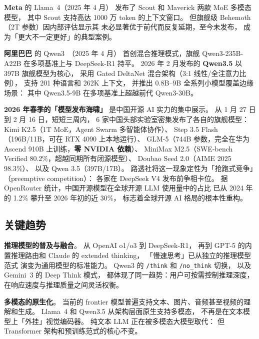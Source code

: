 \textbf{Meta} 的 Llama~4（2025 年 4 月）
发布了 Scout 和 Maverick 两款 MoE 多模态模型，
其中 Scout 支持高达 1000 万 token 的上下文窗口。
但旗舰级 Behemoth（2T 参数）因内部评估显示其
未必显著优于前代而反复延期，至今未发布，
成为「更大不一定更好」的典型案例。

\textbf{阿里巴巴} 的 Qwen3~\cite{qwen2025qwen3}（2025 年 4 月）
首创混合推理模式，旗舰 Qwen3-235B-A22B 在多项基准上与 DeepSeek-R1 持平。
2026 年 2 月发布的 \textbf{Qwen3.5} 以 397B 旗舰模型为核心，
采用 Gated DeltaNet 混合架构（3:1 线性/全注意力比例），
支持 201 种语言和 262K 上下文，
并推出 0.8B--9B 全系列小模型覆盖边缘场景：
其中 Qwen3.5-9B 在多项基准上超越前代 Qwen3-30B。

\textbf{2026 年春季的「模型发布海啸」}
是中国开源 AI 实力的集中展示。
从 1 月 27 日到 2 月 16 日，短短三周内，
6 家中国头部实验室密集发布了各自的旗舰模型：
Kimi K2.5（1T MoE，Agent Swarm 多智能体协作）、
Step 3.5 Flash（196B/11B，可在 RTX 4090 上本地运行）、
GLM-5（744B 参数，完全在华为 Ascend 910B 上训练，\textbf{零 NVIDIA 依赖}）、
MiniMax M2.5（SWE-bench Verified 80.2\%，超越同期所有闭源模型）、
Doubao Seed 2.0（AIME 2025 98.3\%）、
以及 Qwen 3.5（397B/17B）。
路透社将这一现象定性为「抢跑式竞争」（preemptive competition）：
各家在 DeepSeek V4 发布前争相卡位。
据 OpenRouter 统计，中国开源模型在全球开源 LLM 使用量中的占比
已从 2024 年的 1.2\% 攀升至 2026 年初的近 30\%，
标志着全球开源 AI 格局的根本性重构。

\subsection{关键趋势}

\textbf{推理模型的普及与融合}。
从 OpenAI o1/o3 到 DeepSeek-R1，
再到 GPT-5 的内置推理路由和 Claude 的 extended thinking，
「慢速思考」已从独立的推理模型范式
演变为通用模型的标准能力。
Qwen3 的 \texttt{/think} 和 \texttt{/no\_think} 切换，
以及 Gemini~3 的 Deep Think 模式，
都体现了同一趋势：用户可按需控制推理深度，
在响应速度与推理质量之间灵活权衡。

\textbf{多模态的原生化}。
当前的 frontier 模型普遍支持文本、图片、音频甚至视频的理解和生成。
Llama~4 和 Qwen3.5 从架构层面原生支持多模态，
不再是在文本模型上「外挂」视觉编码器。
纯文本 LLM 正在被多模态大模型取代：
但 Transformer 架构和预训练范式的核心不变。

